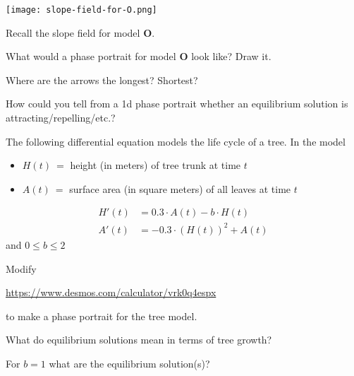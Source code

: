 \documentclass{workbook}
\begin{document}
\begin{slide}

	\question
	
	\begin{center}
	\texttt{[image: slope-field-for-O.png]}
	\end{center}

	Recall the slope field for model \textbf{O}.

	\begin{parts}
		\item What would a phase portrait for model \textbf{O} look like? Draw it.
		\item Where are the arrows the longest? Shortest?
		\item How could you tell from a 1d phase portrait whether an equilibrium solution is
		attracting/repelling/etc.?
	\end{parts}
\end{slide}

\begin{slide}
	\question
	\label{q-phase}
	The following differential equation models the life cycle of a tree.
	In the model
	\begin{itemize}
		\item $H(t)\ =$ height (in meters) of tree trunk at time $t$
		\item $A(t)\ =$ surface area (in square meters) of all leaves at time $t$
	\end{itemize}
	\begin{align*}
		H'(t) &= 0.3\cdot A(t)-b\cdot H(t)\\
		A'(t) &= -0.3\cdot (H(t))^2 + A(t)
	\end{align*}
	and $0 \leq b \leq 2$

	\bigskip
	\phantom{x}
	\begin{parts}
		\item 
		\label{part-phase}
		Modify 

		{\small
		\url{https://www.desmos.com/calculator/vrk0q4espx}
		}

		to make a phase portrait for the tree model.
		\item What do equilibrium solutions mean in terms of tree growth?
		\item For $b=1$ what are the equilibrium solution(s)?
	\end{parts}
	\bigskip
	\phantom{x}
\end{slide}
\end{document}
